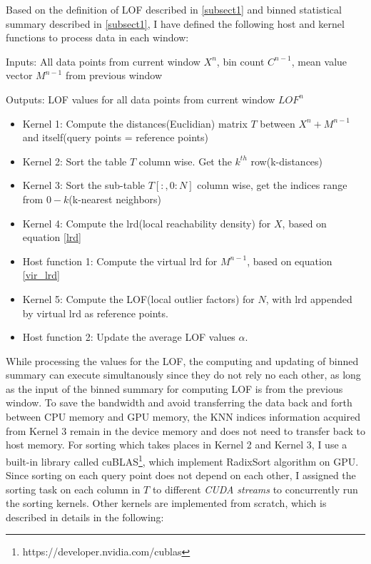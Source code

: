 \documentclass[11pt]{article}       %
\begin{document}
Based on the definition of LOF described in \ref{subsect1} and binned statistical summary described in \ref{subsect1}, I have defined the following host and kernel functions to process data in each window:

Inputs: All data points from current window $X^n$, bin count $C^{n-1}$, mean value vector $M^{n-1}$ from previous window

Outputs: LOF values for all data points from current window $LOF^n$ 

\begin{itemize}
	\item Kernel 1: Compute the distances(Euclidian) matrix $T$ between $X^n + M^{n-1}$ and itself(query points = reference points)
	\item Kernel 2: Sort the table $T$ column wise. Get the $k^{th}$ row(k-distances)
	\item Kernel 3: Sort the sub-table $T[:,0:N]$ column wise, get the indices range from $0 - k$(k-nearest neighbors)			
	\item Kernel 4: Compute the lrd(local reachability density) for $X$, based on equation \ref{lrd}
	\item Host function 1: Compute the virtual lrd for $M^{n-1}$, based on equation \ref{vir_lrd}
	\item Kernel 5: Compute the LOF(local outlier factors) for $N$, with lrd appended by virtual lrd as reference points.
	\item Host function 2: Update the average LOF values $\alpha$.
\end{itemize}		

While processing the values for the LOF, the computing and updating of binned summary can execute simultanously since they do not rely no each other, as long as the input of the binned summary for computing LOF is from the previous window. To save the bandwidth and avoid transferring the data back and forth between CPU memory and GPU memory, the KNN indices information acquired from Kernel 3 remain in the device memory and does not need to transfer back to host memory. For sorting which takes places in Kernel 2 and Kernel 3, I use a built-in library called cuBLAS\footnote{https://developer.nvidia.com/cublas}, which implement RadixSort algorithm on GPU. Since sorting on each query point does not depend on each other, I assigned the sorting task on each column in $T$ to different \textit{CUDA streams} to concurrently run the sorting kernels. Other kernels are implemented from scratch, which is described in details in the following:
\end{document}
